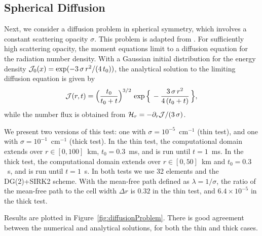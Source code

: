 \documentclass[10pt,preprint]{aastex}
\begin{document}
\subsection{Spherical Diffusion}

Next, we consider a diffusion problem in spherical symmetry, which involves a constant scattering opacity $\sigma$.  
This problem is adapted from \citet{abdikamalov_etal_2012} \citep[see also][]{pons_etal_2000,sumiyoshiYamada_2012}.  
For sufficiently high scattering opacity, the moment equations limit to a diffusion equation for the radiation number density.  
With a Gaussian initial distribution for the energy density $\mathcal{J}_{0}(x)=\exp(-3\,\sigma\,r^{2}/(4\,t_{0}))$, the analytical solution to the limiting diffusion equation is given by
\begin{equation}
  \mathcal{J}(r,t)=\Big(\frac{t_{0}}{t_{0}+t}\Big)^{3/2}\,\exp\Big\{\,-\frac{3\,\sigma\,r^{2}}{4\,(t_{0}+t)}\,\Big\},
\end{equation}
while the number flux is obtained from $\mathcal{H}_{r}=-\partial_{r}{\mathcal{J}}/(3\,\sigma)$.  

We present two versions of this test:  one with $\sigma=10^{-5}$~cm$^{-1}$ (thin test), and one with $\sigma=10^{-1}$~cm$^{-1}$ (thick test).  
In the thin test, the computational domain extends over $r\in[0,100]$~km, $t_{0}=0.3$~ms, and is run until $t=1$~ms.  
In the thick test, the computational domain extends over $r\in[0,50]$~km and $t_{0}=0.3$~s, and is run until $t=1$~s.  
In both tests we use 32 elements and the DG(2)+SIRK2 scheme.  
With the mean-free path defined as $\lambda=1/\sigma$, the ratio of the mean-free path to the cell width $\Delta r$ is $0.32$ in the thin test, and $6.4\times10^{-5}$ in the thick test.  

Results are plotted in Figure~\ref{fig:diffusionProblem}.  
There is good agreement between the numerical and analytical solutions, for both the thin and thick cases.  
\end{document}
